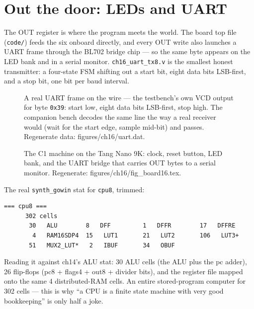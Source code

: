 \section{Out the door: LEDs and UART}\label{sec:out16}

The OUT register is where the program meets the world. The board
top file (\texttt{code/}) feeds the six onboard
directly, and every OUT write also launches a UART frame through the
BL702 bridge chip --- so the same byte appears on the LED bank and in
a serial monitor. \texttt{ch16\_uart\_tx8.v} is the smallest honest
transmitter: a four-state FSM shifting out a start bit, eight data
bits LSB-first, and a stop bit, one bit per baud interval.

\begin{figure}[htbp]
\centering

\caption{A real UART frame on the wire --- the testbench's own VCD
output for byte \texttt{0x39}: start low, eight data bits LSB-first,
stop high. The companion bench decodes the same line the way a real
receiver would (wait for the start edge, sample mid-bit) and passes.
Regenerate data: \ttfamily figures/ch16/uart.dat.}
\label{fig:uart16}
\end{figure}

\begin{figure}[htbp]
\centering

\caption{The C1 machine on the Tang Nano 9K: clock, reset button, LED
bank, and the UART bridge that carries OUT bytes to a serial monitor.
Regenerate: \ttfamily figures/ch16/fig\_board16.tex.}
\label{fig:board16}
\end{figure}

\begin{example}
The real \texttt{synth\_gowin} stat for \texttt{cpu8}, trimmed:

\begin{lstlisting}[caption={A working CPU in 302 cells --- less than
4\% of the smallest FPGA this book uses.}]
=== cpu8 ===
      302 cells
       30   ALU        8   DFF         1   DFFR        17   DFFRE
        4   RAM16SDP4  15   LUT1       21   LUT2       106   LUT3+
       51   MUX2_LUT*   2   IBUF       34   OBUF
\end{lstlisting}

Reading it against ch14's ALU stat: 30 ALU cells (the ALU plus the
pc adder), 26 flip-flops (pc8 + flags4 + out8 + divider bits), and
the register file mapped onto the same 4 distributed-RAM cells. An
entire stored-program computer for 302 cells --- this is why ``a CPU
is a finite state machine with very good bookkeeping'' is only half
a joke.
\end{example}

